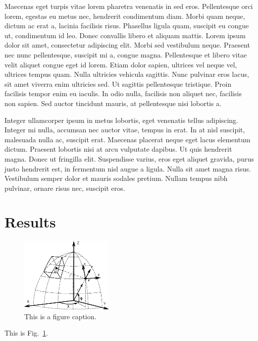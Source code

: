 \documentclass[extra,mreferee]{gji}
\begin{document}
Maecenas eget turpis vitae lorem pharetra venenatis in sed eros. Pellentesque
orci lorem, egestas eu metus nec, hendrerit condimentum diam. Morbi quam neque,
dictum ac erat a, lacinia facilisis risus. Phasellus ligula quam, suscipit eu
congue ut, condimentum id leo. Donec convallis libero et aliquam mattis. Lorem
ipsum dolor sit amet, consectetur adipiscing elit. Morbi sed vestibulum neque.
Praesent nec nunc pellentesque, suscipit mi a, congue magna. Pellentesque et
libero vitae velit aliquet congue eget id lorem. Etiam dolor sapien, ultrices
vel neque vel, ultrices tempus quam. Nulla ultricies vehicula sagittis. Nunc
pulvinar eros lacus, sit amet viverra enim ultricies sed. Ut sagittis
pellentesque tristique. Proin facilisis tempor enim eu iaculis. In odio nulla,
facilisis non aliquet nec, facilisis non sapien. Sed auctor tincidunt mauris,
at pellentesque nisi lobortis a.

Integer ullamcorper ipsum in metus lobortis, eget venenatis tellus adipiscing.
Integer mi nulla, accumsan nec auctor vitae, tempus in erat. In at nisl
suscipit, malesuada nulla ac, suscipit erat. Maecenas placerat neque eget lacus
elementum dictum. Praesent lobortis nisi at arcu vulputate dapibus. Ut quis
hendrerit magna. Donec ut fringilla elit. Suspendisse varius, eros eget aliquet
gravida, purus justo hendrerit est, in fermentum nisl augue a ligula. Nulla sit
amet magna risus. Vestibulum semper dolor et mauris sodales pretium. Nullam
tempus nibh pulvinar, ornare risus nec, suscipit eros.

\section{Results}

\begin{figure}
    \includegraphics[width=0.4\textwidth]{figs/figure}
    \caption{This is a figure caption.}
    \label{fig:figure}
\end{figure}

This is Fig.~\ref{fig:figure}.
\end{document}

